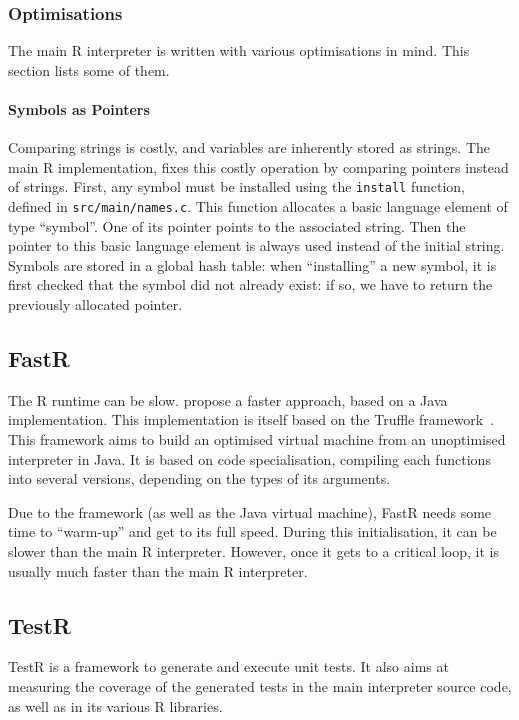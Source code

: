 \documentclass{article}
\newcommand\R{R}
\begin{document}
\subsubsection{Optimisations}

The main \R{} interpreter is written with various optimisations in mind.
This section lists some of them.

\paragraph{Symbols as Pointers}
%
Comparing strings is costly,
and variables are inherently stored as strings.
The main \R{} implementation,
fixes this costly operation by comparing pointers
instead of strings.
First, any symbol must be installed using the \texttt{install}
function, defined in \texttt{src/main/names.c}.
This function allocates a basic language element
of type “symbol”.
One of its pointer points to the associated string.
Then the pointer to this basic language element
is always used instead of the initial string.
%
Symbols are stored in a global hash table:
when “installing” a new symbol, it is first checked
that the symbol did not already exist:
if so, we have to return the previously allocated pointer.


\subsection{FastR}

The \R{} runtime can be slow.
\cite{kalibera2014fast} propose a faster approach,
based on a Java implementation.
This implementation is itself based on the Truffle
framework~\parencite{wimmer2012truffle}.
This framework aims to build an optimised virtual machine
from an unoptimised interpreter in Java.
It is based on code specialisation,
compiling each functions into several versions,
depending on the types of its arguments.

Due to the framework (as well as the Java virtual machine),
FastR needs some time to “warm-up” and get to its full speed.
During this initialisation, it can be slower than the main
\R{} interpreter.
However, once it gets to a critical loop,
it is usually much faster than the main \R{} interpreter.

\subsection{TestR}

TestR is a framework to generate and execute unit tests.
It also aims at measuring the coverage of the generated tests
in the main interpreter source code,
as well as in its various \R{} libraries.
\end{document}
